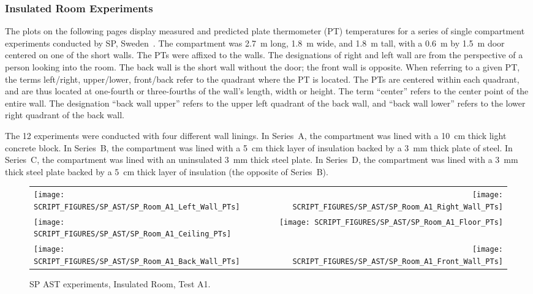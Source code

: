 \subsubsection{Insulated Room Experiments}

The plots on the following pages display measured and predicted plate thermometer (PT) temperatures for a series of single compartment experiments conducted by SP, Sweden~\cite{Sjostrom:SP2016}. The compartment was 2.7~m long, 1.8~m wide, and 1.8~m tall, with a 0.6~m by 1.5~m door centered on one of the short walls. The PTs were affixed to the walls. The designations of right and left wall are from the perspective of a person looking into the room. The back wall is the short wall without the door; the front wall is opposite. When referring to a given PT, the terms left/right, upper/lower, front/back refer to the quadrant where the PT is located. The PTs are centered within each quadrant, and are thus located at one-fourth or three-fourths of the wall's length, width or height. The term ``center'' refers to the center point of the entire wall. The designation ``back wall upper'' refers to the upper left quadrant of the back wall, and ``back wall lower'' refers to the lower right quadrant of the back wall.

The 12 experiments were conducted with four different wall linings. In Series~A, the compartment was lined with a 10~cm thick light concrete block. In Series~B, the compartment was lined with a 5~cm thick layer of insulation backed by a 3~mm thick plate of steel. In Series~C, the compartment was lined with an uninsulated 3~mm thick steel plate. In Series~D, the compartment was lined with a 3~mm thick steel plate backed by a 5~cm thick layer of insulation (the opposite of Series~B).

\newpage

\begin{figure}[p]
\begin{tabular*}{\textwidth}{l@{\extracolsep{\fill}}r}
\texttt{[image: SCRIPT\_FIGURES/SP\_AST/SP\_Room\_A1\_Left\_Wall\_PTs]} &  \texttt{[image: SCRIPT\_FIGURES/SP\_AST/SP\_Room\_A1\_Right\_Wall\_PTs]}  \\
\texttt{[image: SCRIPT\_FIGURES/SP\_AST/SP\_Room\_A1\_Ceiling\_PTs]}   &  \texttt{[image: SCRIPT\_FIGURES/SP\_AST/SP\_Room\_A1\_Floor\_PTs]}  \\
\texttt{[image: SCRIPT\_FIGURES/SP\_AST/SP\_Room\_A1\_Back\_Wall\_PTs]} &  \texttt{[image: SCRIPT\_FIGURES/SP\_AST/SP\_Room\_A1\_Front\_Wall\_PTs]}
\end{tabular*}
\caption[SP AST experiments, Insulated Room, Test A1]{SP AST experiments, Insulated Room, Test A1.}
\label{SP_Room_A1_PTs}
\end{figure}


